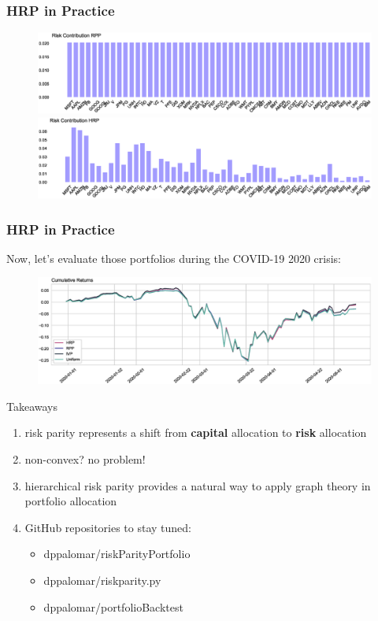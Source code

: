 \documentclass[aspectratio=169]{beamer}
\begin{document}
\begin{frame}
  \frametitle{HRP in Practice}
  \begin{figure}
    \includegraphics[scale=.5]{images/risk_contrib_rpp.eps}
  \pause
    \includegraphics[scale=.5]{images/risk_contrib_hrp.eps}
  \end{figure}
\end{frame}


\begin{frame}
\frametitle{HRP in Practice}
Now, let's evaluate those portfolios during the COVID-19 2020 crisis:
\pause
\begin{figure}
  \includegraphics[scale=.5]{images/cum_returns.eps}
\end{figure}
\end{frame}

\begin{frame}{Takeaways}
  \vspace{.5cm}
  \begin{enumerate}
    \item risk parity represents a shift from \textbf{capital} allocation to \textbf{risk} allocation
            \pause
        \vspace{.25cm}
    \item non-convex? no problem!
            \pause
        \vspace{.25cm}
    \item hierarchical risk parity provides a natural way to apply graph theory in portfolio allocation
    \item GitHub repositories to stay tuned:
      \begin{itemize}
        \item dppalomar/riskParityPortfolio
        \item dppalomar/riskparity.py
        \item dppalomar/portfolioBacktest
      \end{itemize}
  \end{enumerate}
\end{frame}
\end{document}
